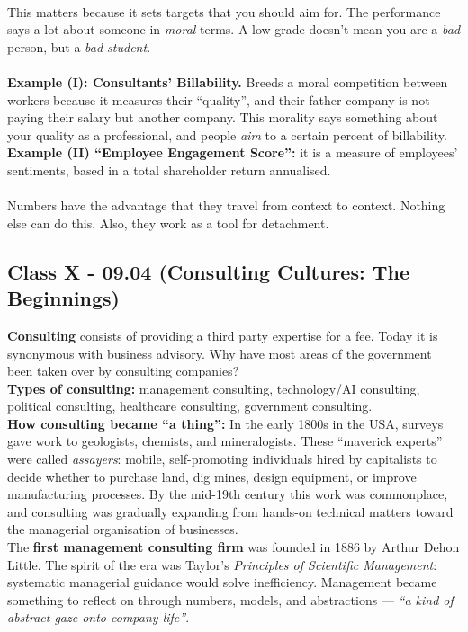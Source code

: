 \documentclass[a4paper,12pt]{article}
\begin{document}
\\
\noindent This matters because it sets targets that you should aim for. The performance says a lot about someone in \emph{moral} terms. A low grade doesn't mean you are a \emph{bad} person, but a \emph{bad student}. \\
\\
\noindent \textbf{Example (I): Consultants' Billability.} Breeds a moral competition between workers because it measures their ``quality'', and their father company is not paying their salary but another company. This morality says something about your quality as a professional, and people \emph{aim} to a certain percent of billability. \\
\noindent \textbf{Example (II) ``Employee Engagement Score'':} it is a measure of employees' sentiments, based in a total shareholder return annualised. \\
\\
\noindent Numbers have the advantage that they travel from context to context. Nothing else can do this. Also, they work as a tool for detachment.
\subsection*{Class X - 09.04 (Consulting Cultures: The Beginnings)}
\noindent \textbf{Consulting} consists of providing a third party expertise for a fee. Today it is synonymous with business advisory. Why have most areas of the government been taken over by consulting companies? \\

\noindent \textbf{Types of consulting:} management consulting, technology/AI consulting, political consulting, healthcare consulting, government consulting. \\

\noindent \textbf{How consulting became ``a thing'':} In the early 1800s in the USA, surveys gave work to geologists, chemists, and mineralogists. These ``maverick experts'' were called \emph{assayers}: mobile, self-promoting individuals hired by capitalists to decide whether to purchase land, dig mines, design equipment, or improve manufacturing processes. By the mid-19th century this work was commonplace, and consulting was gradually expanding from hands-on technical matters toward the managerial organisation of businesses. \\

\noindent The \textbf{first management consulting firm} was founded in 1886 by Arthur Dehon Little. The spirit of the era was Taylor's \emph{Principles of Scientific Management}: systematic managerial guidance would solve inefficiency. Management became something to reflect on through numbers, models, and abstractions --- \emph{``a kind of abstract gaze onto company life''}. \\
\end{document}
